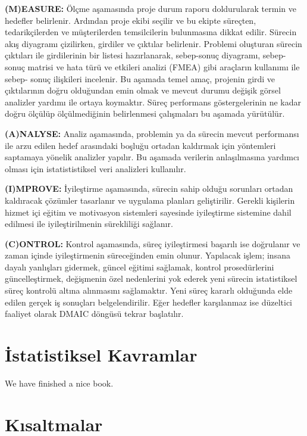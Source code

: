 \documentclass[
]{book}
\begin{document}
\textbf{(M)EASURE:} Ölçme aşamasında proje durum raporu doldurularak termin ve hedefler belirlenir. Ardından proje ekibi seçilir ve bu ekipte süreçten, tedarikçilerden ve müşterilerden temsilcilerin bulunmasına dikkat edilir. Sürecin akış diyagramı çizilirken, girdiler ve çıktılar belirlenir. Problemi oluşturan sürecin çıktıları ile girdilerinin bir listesi hazırlanarak, sebep-sonuç diyagramı, sebep-sonuç matrisi ve hata türü ve etkileri analizi (FMEA) gibi araçların kullanımı ile sebep- sonuç ilişkileri incelenir. Bu aşamada temel amaç, projenin girdi ve çıktılarının doğru olduğundan emin olmak ve mevcut durumu değişik görsel analizler yardımı ile ortaya koymaktır. Süreç performans göstergelerinin ne kadar doğru ölçülüp ölçülmediğinin belirlenmesi çalışmaları bu aşamada yürütülür.

\textbf{(A)NALYSE:} Analiz aşamasında, problemin ya da sürecin mevcut performansı ile arzu edilen hedef arasındaki boşluğu ortadan kaldırmak için yöntemleri saptamaya yönelik analizler yapılır. Bu aşamada verilerin anlaşılmasına yardımcı olması için istatististiksel veri analizleri kullanılır.

\textbf{(I)MPROVE:} İyileştirme aşamasında, sürecin sahip olduğu sorunları ortadan kaldıracak çözümler tasarlanır ve uygulama planları geliştirilir. Gerekli kişilerin hizmet içi eğitim ve motivasyon sistemleri sayesinde iyileştirme sistemine dahil edilmesi ile iyileştirilmenin sürekliliği sağlanır.

\textbf{(C)ONTROL:} Kontrol aşamasında, süreç iyileştirmesi başarılı ise doğrulanır ve zaman içinde iyileştirmenin süreceğinden emin olunur. Yapılacak işlem; insana dayalı yanlışları gidermek, güncel eğitimi sağlamak, kontrol prosedürlerini güncelleştirmek, değişmenin özel nedenlerini yok ederek yeni sürecin istatistiksel süreç kontrolü altına alınmasını sağlamaktır. Yeni süreç kararlı olduğunda elde edilen gerçek iş sonuçları belgelendirilir. Eğer hedefler karşılanmaz ise düzeltici faaliyet olarak DMAIC döngüsü tekrar başlatılır.

\hypertarget{istatistiksel-kavramlar}{%
\chapter{İstatistiksel Kavramlar}\label{istatistiksel-kavramlar}}

We have finished a nice book.

\hypertarget{kux131saltmalar}{%
\chapter{Kısaltmalar}\label{kux131saltmalar}}
\end{document}
